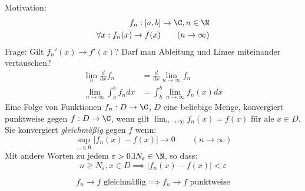 \documentclass[a4paper,10pt]{scrartcl}
\begin{document}
Motivation:\
\begin{align*}
 f_n:[a,b]\to \C, n\in \N\\
\forall x: f_n(x)\to f(x) \qquad (n\to\infty)\\
\end{align*}
Frage: Gilt $f_n'(x)\to f'(x)$? Darf man Ableitung und Limes miteinander vertauschen?
\begin{align*}
	\lim_n\frac d{dx}f_n&=\frac d{dx}\lim_{n\to\infty}f_n\\
\lim_{n\to\infty}\int_a^bf_ndx&=\int_b^b\lim_{n\to\infty}f_n(x)dx
\end{align*}
Eine Folge von Funktionen $f_n:D\to\C$, $D$ eine beliebige Menge, konvergiert punktweise gegen $f:D\to\C$, wenn gilt $\lim_{n\to\infty}f_n(x)=f(x)$ für ale $x\in D$.
Sie konvergiert \emph{gleichmäßig} gegen $f$ wenn:
\[
\sup_{…\in 0}|f_n(x)-f(x)|\to 0\qquad (n\to\infty)
\]
Mit andere Worten zu jedem $\varepsilon>0 \exists N_\varepsilon \in \N$, so dass:
\[
n\ge N_\varepsilon, x\in D \implies |f_n(x)-f(x)|<\varepsilon
\]
\begin{note}
\[
f_n\to f \text{ gleichmäßig} \implies f_n\to f \text{ punktweise}
\]
\end{note}
\end{document}
